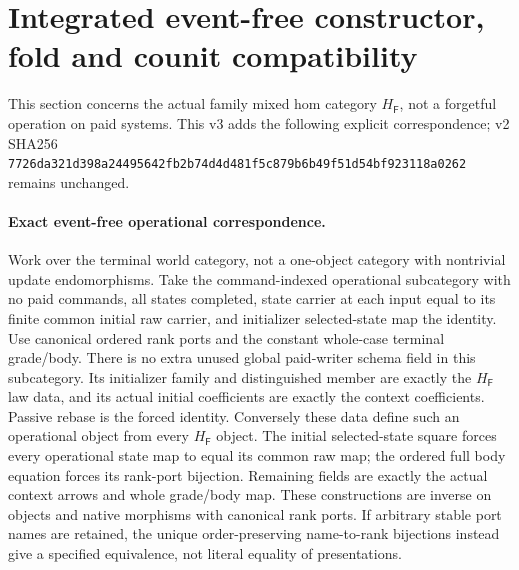 \documentclass[11pt]{article}
\begin{document}
\section{Integrated event-free constructor, fold and counit compatibility}
This section concerns the actual family mixed hom category $H_{\mathsf F}$, not a forgetful operation on paid systems. This v3 adds the following explicit correspondence; v2 SHA256 \texttt{7726da321d398a24495642fb2b74d4d481f5c879b6b49f51d54bf923118a0262} remains unchanged.

\paragraph{Exact event-free operational correspondence.} Work over the terminal world category, not a one-object category with nontrivial update endomorphisms. Take the command-indexed operational subcategory with no paid commands, all states completed, state carrier at each input equal to its finite common initial raw carrier, and initializer selected-state map the identity. Use canonical ordered rank ports and the constant whole-case terminal grade/body. There is no extra unused global paid-writer schema field in this subcategory. Its initializer family and distinguished member are exactly the $H_{\mathsf F}$ law data, and its actual initial coefficients are exactly the context coefficients. Passive rebase is the forced identity. Conversely these data define such an operational object from every $H_{\mathsf F}$ object. The initial selected-state square forces every operational state map to equal its common raw map; the ordered full body equation forces its rank-port bijection. Remaining fields are exactly the actual context arrows and whole grade/body map. These constructions are inverse on objects and native morphisms with canonical rank ports. If arbitrary stable port names are retained, the unique order-preserving name-to-rank bijections instead give a specified equivalence, not literal equality of presentations.
\end{document}
